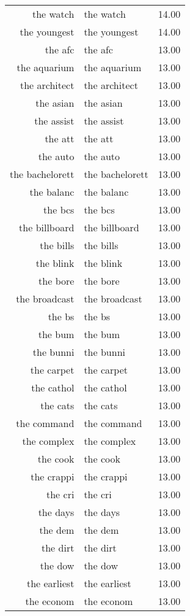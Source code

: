 \begin{table}[ht]
\begin{tabular}{rlr}
  the watch & the watch & 14.00 \\ 
  the youngest & the youngest & 14.00 \\ 
  the afc & the afc & 13.00 \\ 
  the aquarium & the aquarium & 13.00 \\ 
  the architect & the architect & 13.00 \\ 
  the asian & the asian & 13.00 \\ 
  the assist & the assist & 13.00 \\ 
  the att & the att & 13.00 \\ 
  the auto & the auto & 13.00 \\ 
  the bachelorett & the bachelorett & 13.00 \\ 
  the balanc & the balanc & 13.00 \\ 
  the bcs & the bcs & 13.00 \\ 
  the billboard & the billboard & 13.00 \\ 
  the bills & the bills & 13.00 \\ 
  the blink & the blink & 13.00 \\ 
  the bore & the bore & 13.00 \\ 
  the broadcast & the broadcast & 13.00 \\ 
  the bs & the bs & 13.00 \\ 
  the bum & the bum & 13.00 \\ 
  the bunni & the bunni & 13.00 \\ 
  the carpet & the carpet & 13.00 \\ 
  the cathol & the cathol & 13.00 \\ 
  the cats & the cats & 13.00 \\ 
  the command & the command & 13.00 \\ 
  the complex & the complex & 13.00 \\ 
  the cook & the cook & 13.00 \\ 
  the crappi & the crappi & 13.00 \\ 
  the cri & the cri & 13.00 \\ 
  the days & the days & 13.00 \\ 
  the dem & the dem & 13.00 \\ 
  the dirt & the dirt & 13.00 \\ 
  the dow & the dow & 13.00 \\ 
  the earliest & the earliest & 13.00 \\ 
  the econom & the econom & 13.00 \\ 

\end{tabular}
\end{table}
